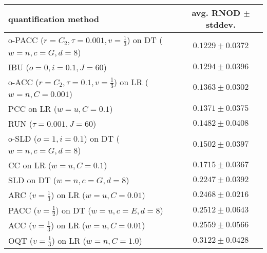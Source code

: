 \begin{tabular}{lc}
  \toprule
  quantification method & avg. RNOD $\pm$ stddev. \\
  \midrule
  o-PACC ($r=C_2, \tau=0.001, v=\frac{1}{3}$) on DT ($w=n, c=G, d=8$) & $\mathbf{0.1229 \pm 0.0372}$ \\
  IBU ($o=0, i=0.1, J=60$) & $0.1294 \pm 0.0396$ \\
  o-ACC ($r=C_2, \tau=0.1, v=\frac{1}{3}$) on LR ($w=n, C=0.001$) & $0.1363 \pm 0.0302$ \\
  PCC on LR ($w=u, C=0.1$) & $0.1371 \pm 0.0375$ \\
  RUN ($\tau=0.001, J=60$) & $0.1482 \pm 0.0408$ \\
  o-SLD ($o=1, i=0.1$) on DT ($w=n, c=G, d=8$) & $0.1502 \pm 0.0397$ \\
  CC on LR ($w=u, C=0.1$) & $0.1715 \pm 0.0367$ \\
  SLD on DT ($w=n, c=G, d=8$) & $0.2247 \pm 0.0392$ \\
  ARC ($v=\frac{1}{3}$) on LR ($w=u, C=0.01$) & $0.2468 \pm 0.0216$ \\
  PACC ($v=\frac{1}{2}$) on DT ($w=u, c=E, d=8$) & $0.2512 \pm 0.0643$ \\
  ACC ($v=\frac{1}{3}$) on LR ($w=u, C=0.01$) & $0.2559 \pm 0.0566$ \\
  OQT ($v=\frac{1}{3}$) on LR ($w=n, C=1.0$) & $0.3122 \pm 0.0428$ \\
  \bottomrule
\end{tabular}
